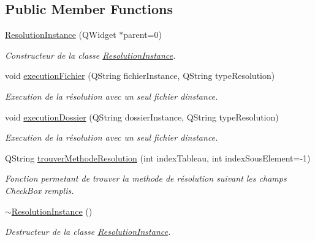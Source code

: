 \subsection*{Public Member Functions}
\begin{DoxyCompactItemize}
\item 
\hyperlink{classResolutionInstance_a90e1ee7d8245bed88624a159b00cb6a7}{Resolution\+Instance} (Q\+Widget $\ast$parent=0)
\begin{DoxyCompactList}\small\item\em Constructeur de la classe \hyperlink{classResolutionInstance}{Resolution\+Instance}. \end{DoxyCompactList}\item 
void \hyperlink{classResolutionInstance_a69b08f7877d8f12481f02bc31d1d391b}{execution\+Fichier} (Q\+String fichier\+Instance, Q\+String type\+Resolution)
\begin{DoxyCompactList}\small\item\em Execution de la résolution avec un seul fichier d\textquotesingle{}instance. \end{DoxyCompactList}\item 
void \hyperlink{classResolutionInstance_aa4184555e523d745accf570986f6fe45}{execution\+Dossier} (Q\+String dossier\+Instance, Q\+String type\+Resolution)
\begin{DoxyCompactList}\small\item\em Execution de la résolution avec un seul fichier d\textquotesingle{}instance. \end{DoxyCompactList}\item 
Q\+String \hyperlink{classResolutionInstance_a8e5aee07d5f05c978336c09379811aac}{trouver\+Methode\+Resolution} (int index\+Tableau, int index\+Sous\+Element=-\/1)
\begin{DoxyCompactList}\small\item\em Fonction permetant de trouver la methode de résolution suivant les champs Check\+Box remplis. \end{DoxyCompactList}\item 
\hyperlink{classResolutionInstance_acbc867c1e869aafcb0c20a5698e00aee}{$\sim$\+Resolution\+Instance} ()
\begin{DoxyCompactList}\small\item\em Destructeur de la classe \hyperlink{classResolutionInstance}{Resolution\+Instance}. \end{DoxyCompactList}\end{DoxyCompactItemize}


